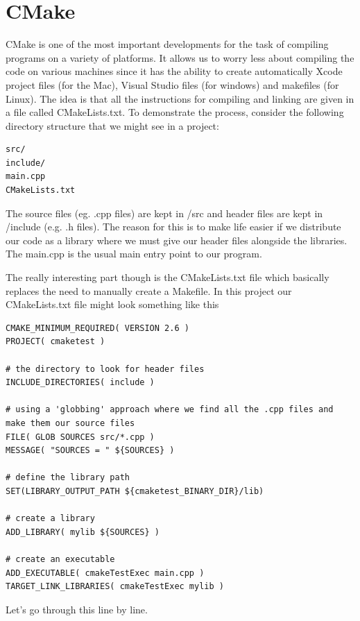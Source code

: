 \section{CMake}
\label{sec:cmake}

CMake is one of the most important developments for the task of
compiling programs on a variety of platforms. It allows us to worry
less about compiling the code on various machines since it has the
ability to create automatically Xcode project files (for the Mac),
Visual Studio files (for windows) and makefiles (for Linux). The idea
is that all the instructions for compiling and linking are given in a
file called CMakeLists.txt. To demonstrate the process, consider the
following directory structure that we might see in a project:
\begin{verbatim}
src/
include/
main.cpp
CMakeLists.txt
\end{verbatim}
The source files (eg. .cpp files) are kept in /src and header files
are kept in /include (e.g. .h files). The reason for this is to make
life easier if we distribute our code as a library where we must give
our header files alongside the libraries. The main.cpp is the usual
main entry point to our program.

The really interesting part though is the CMakeLists.txt file which
basically replaces the need to manually create a Makefile. In this
project our CMakeLists.txt file might look something like this
\begin{verbatim}
CMAKE_MINIMUM_REQUIRED( VERSION 2.6 )
PROJECT( cmaketest )

# the directory to look for header files
INCLUDE_DIRECTORIES( include )

# using a 'globbing' approach where we find all the .cpp files and make them our source files
FILE( GLOB SOURCES src/*.cpp )
MESSAGE( "SOURCES = " ${SOURCES} )

# define the library path
SET(LIBRARY_OUTPUT_PATH ${cmaketest_BINARY_DIR}/lib)

# create a library
ADD_LIBRARY( mylib ${SOURCES} )

# create an executable
ADD_EXECUTABLE( cmakeTestExec main.cpp )
TARGET_LINK_LIBRARIES( cmakeTestExec mylib )
\end{verbatim}

Let's go through this line by line.

